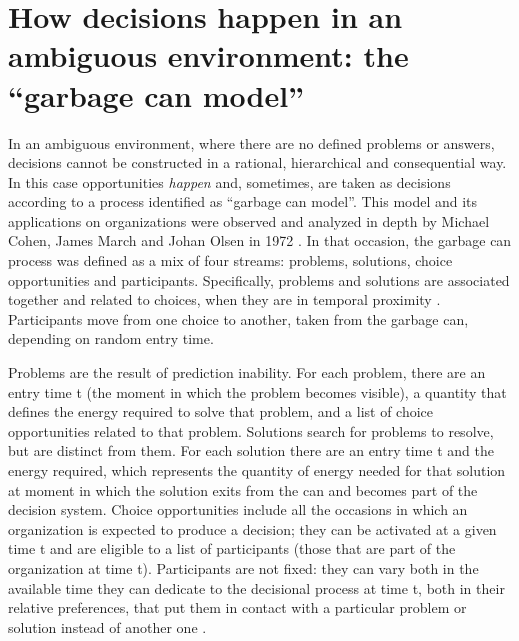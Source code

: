 \section{How decisions happen in an ambiguous environment: the ``garbage can model''}

In an ambiguous environment, where there are no defined problems or answers, decisions cannot be constructed in a rational, hierarchical and consequential way. In this case opportunities \textit{happen} and, sometimes, are taken as decisions according to a process identified as ``garbage can model''\cite{1, 2}. This model and its applications on organizations were observed and analyzed in depth by Michael Cohen, James March and Johan Olsen in 1972 \cite{1}. In that occasion, the garbage can process was defined as a mix of four streams: problems, solutions, choice opportunities and participants. Specifically, problems and solutions are associated together and related to choices, when they are in temporal proximity \cite{2}. Participants move from one choice to another, taken from the garbage can, depending on random entry time.

Problems are the result of prediction inability. For each problem, there are an entry time t (the moment in which the problem becomes visible), a quantity that defines the energy required to solve that problem, and a list of choice opportunities related to that problem. Solutions search for problems to resolve, but are distinct from them. For each solution there are an entry time t and the energy required, which represents the quantity of energy needed for that solution at moment in which the solution exits from the can and becomes part of the decision system. Choice opportunities include all the occasions in which an organization is expected to produce a decision; they  can be activated at a given time t and are eligible to a list of participants (those that are part of the organization at time t). Participants are not fixed: they can vary both in the available time they can dedicate to the decisional process at time t, both in their relative preferences, that put them in contact with a particular problem or solution instead of another one \cite{1}.

